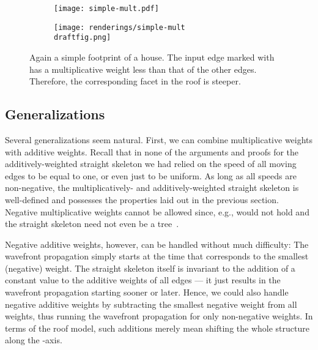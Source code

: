 \documentclass[preprint]{elsarticle}
\newcommand{\draftfig}{.small}
\begin{document}
\begin{figure}[htb!]
  \centering

  \begin{subfigure}[b]{0.48\textwidth}
    \centering
    \texttt{[image: simple-mult.pdf]}
    \caption[]{}
  \end{subfigure}
  \hspace{0.1em}
  \begin{subfigure}[b]{0.48\textwidth}
    \centering
    \texttt{[image: renderings/simple-mult\\draftfig.png]}
    \caption[]{}
  \end{subfigure}

  \caption{Again a simple footprint of a house.  The input edge marked with  has
    a multiplicative weight less than that of the other edges.  Therefore,
    the corresponding facet in the roof is steeper.}
  \label{fig:simple-m-roof}
\end{figure}

\subsection{Generalizations}


Several generalizations seem natural.
First, we can combine multiplicative weights with additive weights.
Recall that in none of the arguments and proofs for the additively-weighted
straight skeleton we had relied on the speed of all moving edges to be equal
to one, or even just to be uniform.
As long as all speeds are non-negative, the multiplicatively- and
additively-weighted straight skeleton is well-defined and possesses the
properties laid out in the previous section.  Negative multiplicative weights
cannot be allowed since, e.g.,  would not hold
and the straight skeleton need not even be a tree~\cite{Bie&15a}.

Negative additive weights, however, can be handled without much difficulty:
The wavefront propagation simply starts at the time that corresponds
to the smallest (negative) weight.
The straight skeleton itself is invariant to the addition of a constant value
to the additive weights of all edges --- it just results in the wavefront
propagation starting sooner or later. Hence, we could also handle negative
additive weights by subtracting the smallest negative weight from all weights,
thus running the wavefront propagation for only non-negative weights.  In
terms of the roof model, such additions merely mean shifting the whole
structure along the -axis.
\end{document}
